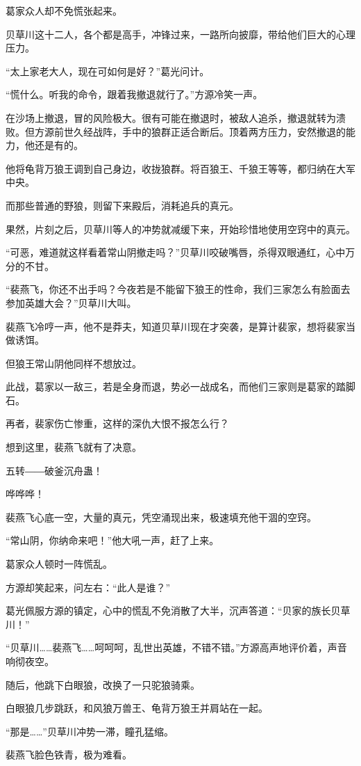 \begin{this_body}
葛家众人却不免慌张起来。

贝草川这十二人，各个都是高手，冲锋过来，一路所向披靡，带给他们巨大的心理压力。

“太上家老大人，现在可如何是好？”葛光问计。

“慌什么。听我的命令，跟着我撤退就行了。”方源冷笑一声。

在沙场上撤退，冒的风险极大。很有可能在撤退时，被敌人追杀，撤退就转为溃败。但方源前世久经战阵，手中的狼群正适合断后。顶着两方压力，安然撤退的能力，他还是有的。

他将龟背万狼王调到自己身边，收拢狼群。将百狼王、千狼王等等，都归纳在大军中央。

而那些普通的野狼，则留下来殿后，消耗追兵的真元。

果然，片刻之后，贝草川等人的冲势就减缓下来，开始珍惜地使用空窍中的真元。

“可恶，难道就这样看着常山阴撤走吗？”贝草川咬破嘴唇，杀得双眼通红，心中万分的不甘。

“裴燕飞，你还不出手吗？今夜若是不能留下狼王的性命，我们三家怎么有脸面去参加英雄大会？”贝草川大叫。

裴燕飞冷哼一声，他不是莽夫，知道贝草川现在才突袭，是算计裴家，想将裴家当做诱饵。

但狼王常山阴他同样不想放过。

此战，葛家以一敌三，若是全身而退，势必一战成名，而他们三家则是葛家的踏脚石。

再者，裴家伤亡惨重，这样的深仇大恨不报怎么行？

想到这里，裴燕飞就有了决意。

五转――破釜沉舟蛊！

哗哗哗！

裴燕飞心底一空，大量的真元，凭空涌现出来，极速填充他干涸的空窍。

“常山阴，你纳命来吧！”他大吼一声，赶了上来。

葛家众人顿时一阵慌乱。

方源却笑起来，问左右：“此人是谁？”

葛光佩服方源的镇定，心中的慌乱不免消散了大半，沉声答道：“贝家的族长贝草川！”

“贝草川……裴燕飞……呵呵呵，乱世出英雄，不错不错。”方源高声地评价着，声音响彻夜空。

随后，他跳下白眼狼，改换了一只驼狼骑乘。

白眼狼几步跳跃，和风狼万兽王、龟背万狼王并肩站在一起。

“那是……”贝草川冲势一滞，瞳孔猛缩。

裴燕飞脸色铁青，极为难看。


\end{this_body}

